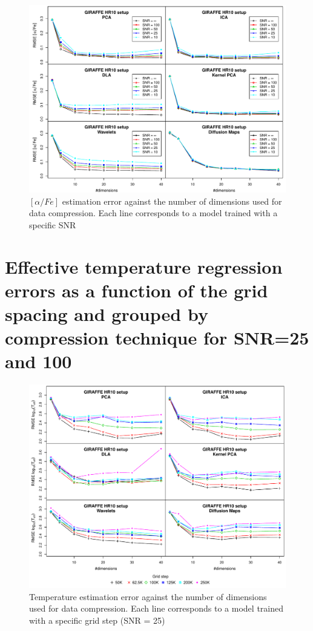 \documentclass[a4paper,fleqn,usenatbib]{mnras}
\begin{document}
{{{\begin{figure}
\centering\includegraphics[width=\textwidth]{flamesHR10_AlFe_log_BestSVM_N-SNR-RMSE_test.pdf}
\caption{$\left[ \alpha/Fe \right]$ estimation error against the number of dimensions
  used for data compression. Each line corresponds to a model trained
  with a specific SNR}
\label{fig:methodsnrAlpha}
\end{figure}

\section{Effective temperature regression errors as a function of the grid spacing and 
	grouped by compression technique for SNR=25 and 100}
\label{a2}

\begin{figure}
\centering\includegraphics[width=\textwidth]{bestSVM_Teff_N-RMSE_HR10_snr=25_all.pdf}
\caption{Temperature estimation error against the number of dimensions
  used for data compression. Each line corresponds to a model trained
  with a specific grid step (SNR = 25)}
\label{fig:grid25}
\end{figure}

}}}
\end{document}
